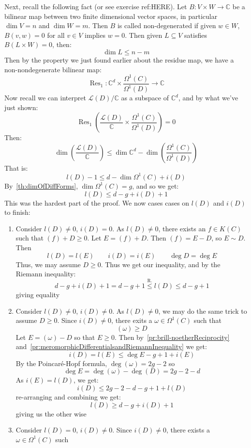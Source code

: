 \documentclass{book}
\newcommand{\C}{{\mathbb{C}}}
\newcommand{\CL}{{\mathcal{L}}}
\newcommand{\Res}{{\operatorname{Res}}}
\newcommand{\sse}{\subseteq}
\begin{document}
\begin{Proof}
  Next, recall the following fact (or see exercise ref:HERE). Let $B: V\times W \to \C$ be a bilinear map
  between two finite dimensional vector spaces, in particular $\dim V = n$ and $\dim W = m$. Then $B$ is called non-degenerated if given $w \in W$, $B(v,w)
  = 0$ for all $v \in V$ implies $w = 0$. Then given $L \sse V$ satisfies $B(L\times W ) = 0$, then:
  \[
    \dim L \le n-m
  \]
  Then by the property we just found earlier about the residue map, we have a non-nondegenerate bilinear map:
  \[
    \Res_1: \C^d \times \frac{\Omega^1(C)}{\Omega^1(D)} \to \C
  \]
  Now recall we can interpret $\CL(D)/\C$ as a subspace of $\C^d$, and by what we've just shown:
  \[
    \Res_1 \left(\frac{\CL(D)}{\C}\times \frac{\Omega^1(C)}{\Omega^1(D)}\right) = 0
  \]
  Then:
  \[
    \dim \left( \frac{\CL(D)}{\C}\right) \le \dim \C^d - \dim \left(\frac{\Omega^1(C)}{\Omega^1(D)}\right)
  \]
  That is:
  \[
    l(D) -1 \le d - \dim \Omega^1(C) + i(D)
  \]
  By~\cref{th:dimOfDiffForms}, $\dim \Omega^1(C) = g$, and so we get:
  \[
    l(D)\le d-g+i(D) + 1
  \]
  This was the hardest part of the proof. We now cases cases on $l(D)$ and $i(D)$ to finish:
  \begin{enumerate}
    \item Consider $l(D) \ne 0$, $i(D) = 0$. As $l(D) \ne 0$, there exists an $f \in K(C)$ such that $(f)
      + D \ge 0$. Let $E = (f) + D$. Then $(f) = E-D$, so $E\sim D$. Then
      \[
        l(D) = l(E) \qquad i(D) = i(E) \qquad \deg D = \deg E
      \]
      Thus, we may assume  $D \ge 0$. Thus we get our inequality, and by the Riemann inequality:
      \[
        d-g+i(D) +1 = d-g+1 \overset{\text{R.}}{\le} l(D) \le d-g+1
      \]
      giving equality
    \item  Consider $l(D) \ne 0$, $i(D) \ne 0$. As $l(D) \ne 0$, we may do the same trick to assume $D\ge 0$.
      Since $i(D) \ne 0$, there exits a $\omega \in \Omega^1(C)$ such that
      \[
        (\omega) \ge D
      \]
      Let $E = (\omega) - D$ so that $E \ge 0$. Then by~\cref{pr:brill-noetherReciprocity}
      and~\cref{pr:meromorphicDifferentialsandRiemannInequality} we get:
      \[
        i(D) = l(E) \le \deg E -g+1+i(E)
      \]
      By the Poincar\'e-Hopf formula, $\deg(\omega) = 2g - 2$ so
      \[
        \deg E = \deg(\omega) - \deg(D) = 2g-2-d
      \]
      As $i(E) = l(D)$, we get:
      \[
        i(D) \le 2g-2-d-g+1+l(D)
      \]
      re-arranging and combining we  get:
      \[
        l(D) \ge d-g+i(D) + 1
      \]
      giving us the other wise
     \item Consider $l(D) = 0 $, $i(D) \ne 0$. Since $i(D) \ne 0$, there exists a $\omega \in \Omega^1(C)$ such

\end{enumerate}
\end{Proof}
\end{document}
